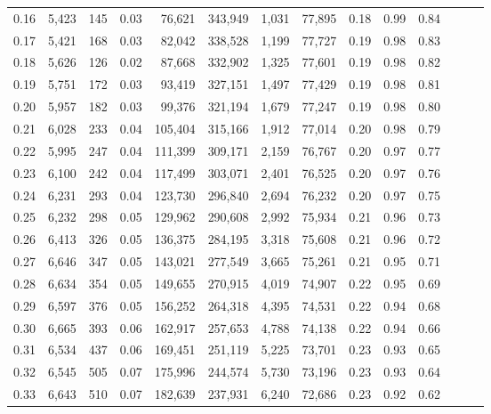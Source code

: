 \begin{tabular}{rrrrrrrrrrrrrr}
0.16 &   5,423 &    145 &  0.03 &   76,621 &  343,949 &   1,031 &  77,895 &  0.18 &  0.99 &      0.84 \\
0.17 &   5,421 &    168 &  0.03 &   82,042 &  338,528 &   1,199 &  77,727 &  0.19 &  0.98 &      0.83 \\
0.18 &   5,626 &    126 &  0.02 &   87,668 &  332,902 &   1,325 &  77,601 &  0.19 &  0.98 &      0.82 \\
0.19 &   5,751 &    172 &  0.03 &   93,419 &  327,151 &   1,497 &  77,429 &  0.19 &  0.98 &      0.81 \\
0.20 &   5,957 &    182 &  0.03 &   99,376 &  321,194 &   1,679 &  77,247 &  0.19 &  0.98 &      0.80 \\
0.21 &   6,028 &    233 &  0.04 &  105,404 &  315,166 &   1,912 &  77,014 &  0.20 &  0.98 &      0.79 \\
0.22 &   5,995 &    247 &  0.04 &  111,399 &  309,171 &   2,159 &  76,767 &  0.20 &  0.97 &      0.77 \\
0.23 &   6,100 &    242 &  0.04 &  117,499 &  303,071 &   2,401 &  76,525 &  0.20 &  0.97 &      0.76 \\
0.24 &   6,231 &    293 &  0.04 &  123,730 &  296,840 &   2,694 &  76,232 &  0.20 &  0.97 &      0.75 \\
0.25 &   6,232 &    298 &  0.05 &  129,962 &  290,608 &   2,992 &  75,934 &  0.21 &  0.96 &      0.73 \\
0.26 &   6,413 &    326 &  0.05 &  136,375 &  284,195 &   3,318 &  75,608 &  0.21 &  0.96 &      0.72 \\
0.27 &   6,646 &    347 &  0.05 &  143,021 &  277,549 &   3,665 &  75,261 &  0.21 &  0.95 &      0.71 \\
0.28 &   6,634 &    354 &  0.05 &  149,655 &  270,915 &   4,019 &  74,907 &  0.22 &  0.95 &      0.69 \\
0.29 &   6,597 &    376 &  0.05 &  156,252 &  264,318 &   4,395 &  74,531 &  0.22 &  0.94 &      0.68 \\
0.30 &   6,665 &    393 &  0.06 &  162,917 &  257,653 &   4,788 &  74,138 &  0.22 &  0.94 &      0.66 \\
0.31 &   6,534 &    437 &  0.06 &  169,451 &  251,119 &   5,225 &  73,701 &  0.23 &  0.93 &      0.65 \\
0.32 &   6,545 &    505 &  0.07 &  175,996 &  244,574 &   5,730 &  73,196 &  0.23 &  0.93 &      0.64 \\
0.33 &   6,643 &    510 &  0.07 &  182,639 &  237,931 &   6,240 &  72,686 &  0.23 &  0.92 &      0.62 \\

\end{tabular}
